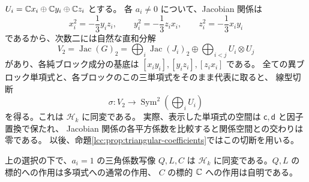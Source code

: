 $U_i=\mathbb C x_i\oplus\mathbb C y_i\oplus\mathbb C z_i$ とする。
各 $a_i\ne0$ について、Jacobian 関係は
\[
 x_i^2=-\frac13y_iz_i,\qquad
 y_i^2=-\frac13z_ix_i,\qquad
 z_i^2=-\frac13x_iy_i
\]
であるから、次数二には自然な直和分解
\begin{equation}\label{lec:eq:jacobian-decomposition}
 V_2=\operatorname{Jac}(G)_2
   =\bigoplus_i\operatorname{Jac}(J_i)_2
      \oplus\bigoplus_{i<j}U_i\otimes U_j
\end{equation}
があり、各純ブロック成分の基底は $[x_iy_i],[y_iz_i],[z_ix_i]$ である。
全ての異ブロック単項式と、各ブロックのこの三単項式をそのまま代表に取ると、
線型切断
\begin{equation}\label{lec:eq:standard-section}
 \sigma:V_2\longrightarrow\operatorname{Sym}^2\!\left(\bigoplus_iU_i\right)
\end{equation}
を得る。これは $\mathcal H_k$ に同変である。
実際、表示した単項式の空間は $\mathsf c,\mathsf d$ と因子置換で保たれ、
Jacobian 関係の各平方係数を比較すると関係空間との交わりは零である。
以後、命題\ref{lcc:prop:triangular-coefficients}ではこの切断を用いる。

\begin{lemma}[実参照族から得る係数の同変性]
\label{lec:lem:equivariant-differences}
上の選択の下で、$a_i=1$ の三角係数写像 $Q,L,C$ は
$\mathcal H_k$ に同変である。$Q,L$ の標的への作用は多項式への通常の作用、
$C$ の標的 $\mathbb C$ への作用は自明である。
\end{lemma}

